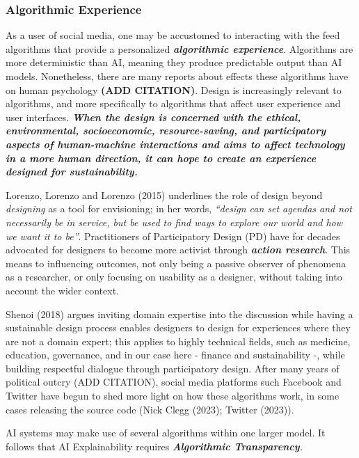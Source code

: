 \documentclass[
  letterpaper,
  DIV=11,
  numbers=noendperiod]{scrartcl}
\begin{document}
\subsubsection{Algorithmic Experience}\label{algorithmic-experience}

As a user of social media, one may be accustomed to interacting with the
feed algorithms that provide a personalized \textbf{\emph{algorithmic
experience}}. Algorithms are more deterministic than AI, meaning they
produce predictable output than AI models. Nonetheless, there are many
reports about effects these algorithms have on human psychology
\textbf{(ADD CITATION)}. Design is increasingly relevant to algorithms,
and more specifically to algorithms that affect user experience and user
interfaces. \textbf{\emph{When the design is concerned with the ethical,
environmental, socioeconomic, resource-saving, and participatory aspects
of human-machine interactions and aims to affect technology in a more
human direction, it can hope to create an experience designed for
sustainability.}}

Lorenzo, Lorenzo and Lorenzo (2015) underlines the role of design beyond
\emph{designing} as a tool for envisioning; in her words, \emph{``design
can set agendas and not necessarily be in service, but be used to find
ways to explore our world and how we want it to be''}. Practitioners of
Participatory Design (PD) have for decades advocated for designers to
become more activist through \textbf{\emph{action research}}. This means
to influencing outcomes, not only being a passive observer of phenomena
as a researcher, or only focusing on usability as a designer, without
taking into account the wider context.

Shenoi (2018) argues inviting domain expertise into the discussion while
having a sustainable design process enables designers to design for
experiences where they are not a domain expert; this applies to highly
technical fields, such as medicine, education, governance, and in our
case here - finance and sustainability -, while building respectful
dialogue through participatory design. After many years of political
outcry (ADD CITATION), social media platforms such Facebook and Twitter
have begun to shed more light on how these algorithms work, in some
cases releasing the source code (Nick Clegg (2023); Twitter (2023)).

AI systems may make use of several algorithms within one larger model.
It follows that AI Explainability requires \emph{\textbf{Algorithmic
Transparency}.}
\end{document}
